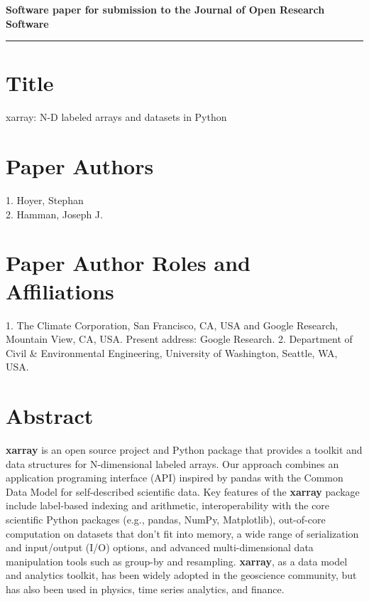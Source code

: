 \documentclass{jors}
\begin{document}
{\bf Software paper for submission to the Journal of Open Research Software} \\



\rule{\textwidth}{1pt}

\vspace{0.5cm}

\section*{Title}

xarray: N-D labeled arrays and datasets in Python

\section*{Paper Authors}

{1. Hoyer, Stephan \\
 2. Hamman, Joseph J.}

\section*{Paper Author Roles and Affiliations}
{1. The Climate Corporation, San Francisco, CA, USA and Google Research, Mountain View, CA, USA. Present address: Google Research. 2. Department of Civil \& Environmental Engineering, University of Washington, Seattle, WA, USA.}

\section*{Abstract}

\textbf{xarray} is an open source project and Python package that provides a toolkit and data structures for N-dimensional labeled arrays.
Our approach combines an application programing interface (API) inspired by pandas with the Common Data Model for self-described scientific data.
Key features of the \textbf{xarray} package include label-based indexing and arithmetic, interoperability with the core scientific Python packages (e.g., pandas, NumPy, Matplotlib), out-of-core computation on datasets that don't fit into memory, a wide range of serialization and input/output (I/O) options, and advanced multi-dimensional data manipulation tools such as group-by and resampling.
\textbf{xarray}, as a data model and analytics toolkit, has been widely adopted in the geoscience community, but has also been used in physics, time series analytics, and finance.
\end{document}
